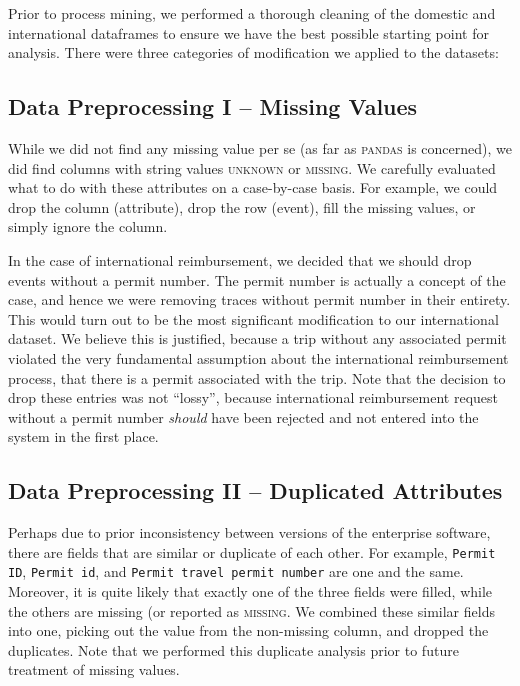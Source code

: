\documentclass[conference]{IEEEtran}
\begin{document}

Prior to process mining, we performed a thorough cleaning of the
domestic and international dataframes to ensure we have
the best possible starting
point for analysis. There were three categories of modification we applied
to the datasets:

\subsection{Data Preprocessing I -- Missing Values}

While we did not find any missing value per se (as far
as \textsc{pandas} is concerned), we did find columns with string values
\textsc{unknown} or \textsc{missing}. We
carefully evaluated what to do with these attributes on a case-by-case
basis. For example, we could drop the column (attribute), drop the row
(event), fill the missing values, or simply ignore the column.

In the case of international reimbursement, we decided that we should
drop events without a permit number. The permit number is actually a
concept of the case, and hence we were removing traces without permit
number in their entirety. This would turn out to be the most significant
modification to our international dataset.
We believe this is justified, because a trip
without any associated permit violated the very fundamental assumption
about the international reimbursement process, that there is a permit
associated with the trip. Note that the decision to drop these entries was
not ``lossy'', because international reimbursement request without a permit
number \textit{should} have been rejected and not entered into the system
in the first place.

\subsection{Data Preprocessing II -- Duplicated Attributes}

Perhaps due to prior inconsistency between
versions of the enterprise software, there are fields that are similar
or duplicate of each other. For example, \texttt{Permit ID}, \texttt{Permit id},
and \texttt{Permit travel permit number} are one and the same.
Moreover, it is quite likely that exactly one of the three fields were
filled, while the others are missing (or reported as
\textsc{missing}. We combined these similar fields into one, picking out
the value from the non-missing column, and dropped the duplicates. Note that 
we performed this duplicate analysis prior to future treatment of missing
values.
\end{document}

